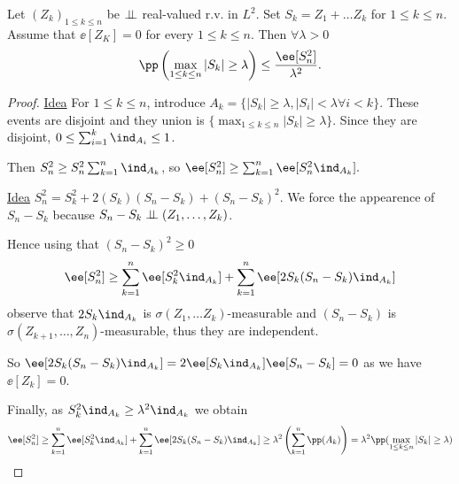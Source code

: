 \documentclass[../main.tex]{subfiles}
\begin{document}
  \begin{lemma}

    Let $(Z_k)_{1 \leq k \leq n}$ be $\perp\!\!\!\!\,\perp$ real-valued r.v. in $L^2$. Set
    $S_k = Z_1 + \ldots Z_k$ for $1 \leq k \leq n$. Assume that $\ee[Z_K] = 0$
    for every $1 \leq k \leq n$. Then $\forall \lambda > 0$
    \[
      \pp \left( \max\limits_{1 \leq k \leq n}|S_k| \geq \lambda \right)  \leq
      \frac{\ee[S_n^2]}{\lambda^2} 
    .\] 
  \end{lemma}
  \begin{proof}
    \underline{Idea} For $1 \leq k \leq n$, introduce $A_k = \{ |S_k| \geq
    \lambda, |S_i| < \lambda \forall i < k \} $. These events are disjoint and
    they union is $\{ \max_{1 \leq k \leq n} |S_k| \geq \lambda \} $. Since they are disjoint, $0
    \leq \sum_{i=1}^k \ind_{A_i} \leq 1$. 

    Then $S_n^2 \geq S_n^2 \sum_{k=1}^n \ind_{A_k}$, so $\ee[S_n^2] \geq \sum_{k=1}^n \ee[S_n^2 \ind_{A_k}]
    .$ 
    \vspace{0.8em}

    \underline{Idea} $S_n^2 = S_k^2 + 2(S_k)(S_n - S_k) + (S_n - S_k)^2$. We
    force the appearence of $S_n - S_k$ because $S_n - S_k \perp\!\!\!\!\,\perp (Z_1, \ldots,
    Z_k)$.

    \vspace{0.3em}

    Hence using that $(S_n - S_k)^2 \geq 0$
    \[
      \ee[S_n^2] \geq \sum_{k=1}^n \ee[S_k^2 \ind_{A_k}] + \sum_{k=1}^n
      \ee[2S_k(S_n - S_k)\ind_{A_k}]
    \] 
    observe that $2 S_k \ind_{A_k}$ is $\sigma(Z_1, \ldots Z_k)$-measurable
    and $(S_n - S_k)$ is $\sigma(Z_{k+1}, \ldots, Z_n)$-measurable, thus they
    are independent.

    \vspace{0.6em}

    So $\ee[2 S_k(S_n - S_k) \ind_{A_k}] = 2 \ee[S_k \ind_{A_k}]\ee[S_n - S_k] =
    0$ as we have $\ee[Z_k] = 0$.
    
    \vspace{0.6em}

    Finally, as $S_k^2 \ind_{A_k} \geq \lambda^2 \ind_{A_k}$ we obtain
    \[
      \ee[S_n^2] \geq \sum_{k=1}^n \ee[S_k^2 \ind_{A_k}] + \sum_{k=1}^n
      \ee[2S_k(S_n - S_k)\ind_{A_k}] \geq \lambda^2 \left( \sum_{k =1}^n
      \pp(A_k) \right) = \lambda^2 \pp(\max_{1 \leq k \leq n} |S_k| \geq
      \lambda)
    \] 
  \end{proof}
\end{document}
